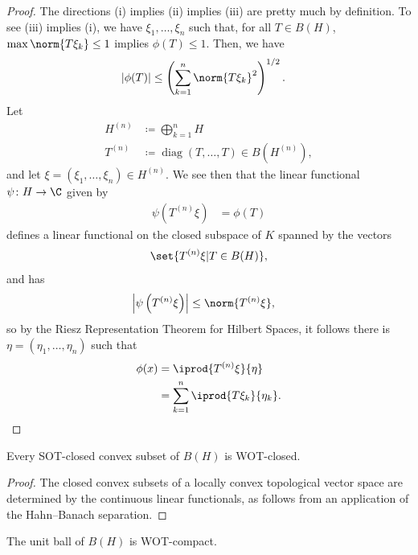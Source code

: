 \documentclass[10pt]{mypackage}
\begin{document}
\begin{proof}
  The directions (i) implies (ii) implies (iii) are pretty much by definition. To see (iii) implies (i), we have $\xi_1,\dots,\xi_n$ such that, for all $T\in B(H)$, $\max\norm{T\xi_k}\leq 1$ implies $\phi(T)\leq 1$. Then, we have
  \begin{align*}
    \left\vert \phi(T) \right\vert &\leq \left( \sum_{k=1}^{n}\norm{T\xi_k}^2 \right)^{1/2}.
  \end{align*}
  Let
  \begin{align*}
    H^{(n)} &\coloneq \bigoplus_{k=1}^{n}H\\
    T^{(n)} &\coloneq \operatorname{diag}\left( T,\dots,T \right)\in B\left( H^{(n)} \right),
  \end{align*}
  and let $\xi = \left( \xi_1,\dots,\xi_n \right)\in H^{(n)}$. We see then that the linear functional $\psi\colon H\rightarrow \C$ given by
  \begin{align*}
    \psi\left( T^{(n)}\xi \right) &= \phi(T)
  \end{align*}
  defines a linear functional on the closed subspace of $K$ spanned by the vectors 
  \begin{align*}
    \set{T^{(n)}\xi | T\in B(H)},
  \end{align*}
  and has
  \begin{align*}
    \left\vert \psi\left( T^{(n)}\xi \right) \right\vert &\leq \norm{T^{(n)}\xi},
  \end{align*}
  so by the Riesz Representation Theorem for Hilbert Spaces, it follows there is $\eta = \left( \eta_1,\dots,\eta_n \right)$ such that
  \begin{align*}
    \phi(x) &= \iprod{T^{(n)}\xi}{\eta}\\
            &= \sum_{k=1}^{n} \iprod{T\xi_k}{\eta_k}.
  \end{align*}
\end{proof}
\begin{corollary}
  Every SOT-closed convex subset of $B(H)$ is WOT-closed.
\end{corollary}
\begin{proof}
  The closed convex subsets of a locally convex topological vector space are determined by the continuous linear functionals, as follows from an application of the Hahn--Banach separation.
\end{proof}
\begin{theorem}
  The unit ball of $B(H)$ is WOT-compact.
\end{theorem}
\end{document}
